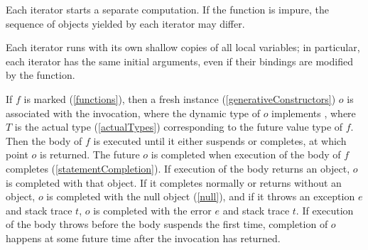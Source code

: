 \documentclass[makeidx]{article}
\begin{document}
{\LMHash{}%
Each iterator starts a separate computation.
If the \code{\SYNC*} function is impure,
the sequence of objects yielded by each iterator may differ.


\LMHash{}%
Each iterator runs with its own shallow copies of all local variables;
in particular, each iterator has the same initial arguments,
even if their bindings are modified by the function.

\LMHash{}%
If $f$ is marked \ASYNC{} (\ref{functions}),
then a fresh instance (\ref{generativeConstructors}) $o$
is associated with the invocation,
where the dynamic type of $o$ implements ,
where $T$ is the actual type
(\ref{actualTypes})
corresponding to the future value type of $f$.
Then the body of $f$ is executed until it either suspends or completes,
at which point $o$ is returned.
The future $o$ is completed when execution of the body of $f$ completes
(\ref{statementCompletion}).
If execution of the body returns an object, $o$ is completed with that object.
If it completes normally or returns without an object,
$o$ is completed with the null object (\ref{null}),
and if it throws an exception $e$ and stack trace $t$,
$o$ is completed with the error $e$ and stack trace $t$.
If execution of the body throws before the body suspends the first time,
completion of $o$ happens at some future time after the invocation has returned.

}
\end{document}
